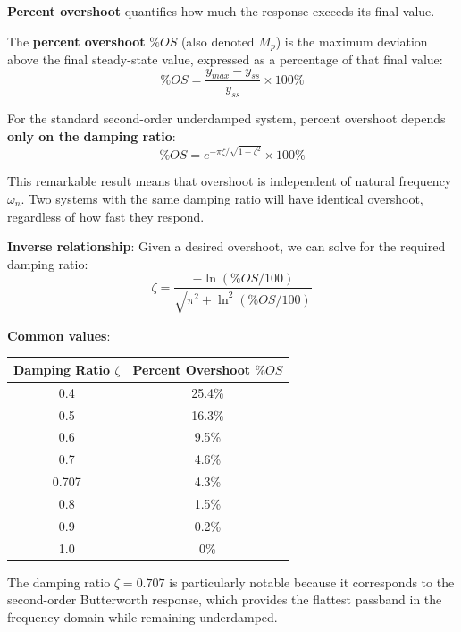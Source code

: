 \textbf{Percent overshoot} quantifies how much the response exceeds its final value.

\begin{definition}
The \textbf{percent overshoot} $\%OS$ (also denoted $M_p$) is the maximum deviation above the final steady-state value, expressed as a percentage of that final value:
\begin{equation}
    \%OS = \frac{y_{max} - y_{ss}}{y_{ss}} \times 100\%
\end{equation}
\end{definition}

For the standard second-order underdamped system, percent overshoot depends \textbf{only on the damping ratio}:
\begin{equation}
    \boxed{\%OS = e^{-\pi\zeta/\sqrt{1-\zeta^2}} \times 100\%}
    \label{eq:overshoot}
\end{equation}

This remarkable result means that overshoot is independent of natural frequency $\omega_n$. Two systems with the same damping ratio will have identical overshoot, regardless of how fast they respond.

\textbf{Inverse relationship}: Given a desired overshoot, we can solve for the required damping ratio:
\begin{equation}
    \zeta = \frac{-\ln(\%OS/100)}{\sqrt{\pi^2 + \ln^2(\%OS/100)}}
    \label{eq:zeta_from_overshoot}
\end{equation}

\textbf{Common values}:
\begin{center}
\begin{tabular}{cc}
\toprule
Damping Ratio $\zeta$ & Percent Overshoot $\%OS$ \\
\midrule
0.4 & 25.4\% \\
0.5 & 16.3\% \\
0.6 & 9.5\% \\
0.7 & 4.6\% \\
0.707 & 4.3\% \\
0.8 & 1.5\% \\
0.9 & 0.2\% \\
1.0 & 0\% \\
\bottomrule
\end{tabular}
\end{center}

The damping ratio $\zeta = 0.707$ is particularly notable because it corresponds to the second-order Butterworth response, which provides the flattest passband in the frequency domain while remaining underdamped.

